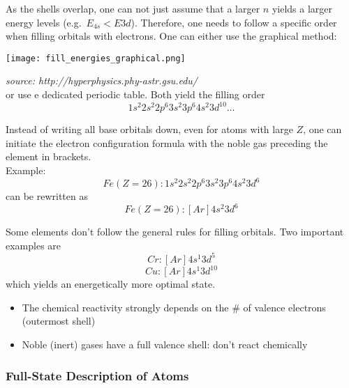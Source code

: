 As the shells overlap, one can not just assume that a larger $n$ yields a larger energy levels (e.g.\ $E_{4s}<E{3d}$). Therefore, one needs to follow a specific order when filling orbitals with electrons. One can either use the graphical method:
\begin{center}
    \texttt{[image: fill\_energies\_graphical.png]}
\end{center}
\textit{source: http://hyperphysics.phy-astr.gsu.edu/}\\
or use e dedicated periodic table. Both yield the filling order
\begin{equation*}
    1s^2 2s^2 2p^6 3s^2 3p^6 4s^2 3d^{10}\dots
\end{equation*}


Instead of writing all base orbitals down, even for atoms with large $Z$, one can initiate the electron configuration formula with the noble gas preceding the element in brackets.\\
Example:\\
\begin{equation*}
    Fe(Z=26): 1s^2 2s^2 2p^6 3s^2 3p^6 4s^2 3d^6
\end{equation*}
can be rewritten as
\begin{equation*}
    Fe(Z=26): \left[Ar\right]4s^2 3d^6
\end{equation*}


Some elements don't follow the general rules for filling orbitals. Two important examples are
\begin{equation*}
    Cr: \left[Ar\right]4s^1 3d^5
\end{equation*}
\begin{equation*}
    Cu: \left[Ar\right]4s^1 3d^{10}
\end{equation*}
which yields an energetically more optimal state.


\begin{itemize}
    \item The chemical reactivity strongly depends on the \# of valence electrons (outermost shell)
    \item Noble (inert) gases have a full valence shell: don't react chemically
\end{itemize}

\subsubsection{Full-State Description of Atoms}

